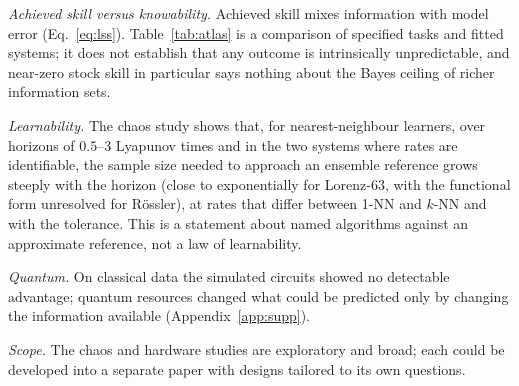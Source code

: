 \documentclass[journal]{IEEEtran}
\theoremstyle{definition}
\begin{document}
\emph{Achieved skill versus knowability.} Achieved skill mixes information with model error (Eq.~\eqref{eq:lss}). Table~\ref{tab:atlas} is a comparison of specified tasks and fitted systems; it does not establish that any outcome is intrinsically unpredictable, and near-zero stock skill in particular says nothing about the Bayes ceiling of richer information sets.

\emph{Learnability.} The chaos study shows that, for nearest-neighbour learners, over horizons of $0.5$--$3$ Lyapunov times and in the two systems where rates are identifiable, the sample size needed to approach an ensemble reference grows steeply with the horizon (close to exponentially for Lorenz-63, with the functional form unresolved for R\"ossler), at rates that differ between 1-NN and $k$-NN and with the tolerance. This is a statement about named algorithms against an approximate reference, not a law of learnability.

\emph{Quantum.} On classical data the simulated circuits showed no detectable advantage; quantum resources changed what could be predicted only by changing the information available (Appendix~\ref{app:supp}).

\emph{Scope.} The chaos and hardware studies are exploratory and broad; each could be developed into a separate paper with designs tailored to its own questions.
\end{document}
